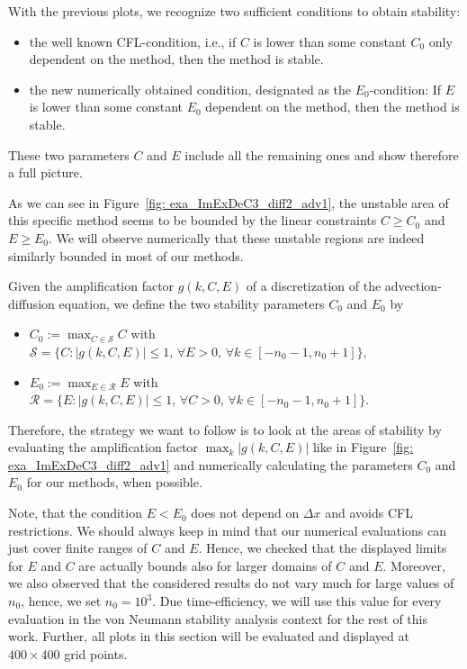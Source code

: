 \begin{remark}
	With the previous plots, we recognize two sufficient conditions to obtain stability:
	\begin{itemize}
		\item the well known CFL-condition, i.e., if $C$ is lower than some constant $C_0$ only dependent on the method, then the method is stable.
		\item the new numerically obtained condition, designated as the $E_0$-condition: If $E$ is lower than some constant $E_0$ dependent on the method, then the method is stable.
	\end{itemize}
	
	These two parameters $C$ and $E$ include all the remaining ones and show therefore a full picture.
\end{remark}

As we can see in Figure~\ref{fig: exa_ImExDeC3_diff2_adv1}, the unstable area of this specific method seems to be bounded by the linear constraints $C\geq C_0$ and $E\geq E_0$. We will observe numerically that these unstable regions are indeed similarly bounded in most of our methods.
\begin{definition}
	Given the amplification factor $g(k,C,E)$ of a discretization of the advection-diffusion equation, we define the two stability parameters $C_0$ and $E_0$ by
	\begin{itemize}
		\item $C_0:=\max_{C\in \mathcal{S}} C$ with $\mathcal{S}=\lbrace C: \lvert g(k,C,E)\rvert \leq 1, \, \forall E>0, \,\forall k \in [-n_0-1,n_0+1] \rbrace$,
		\item $E_0:=\max_{E\in \mathcal{R}}E$ with $\mathcal{R}= \lbrace E: \lvert g(k,C,E)\rvert \leq 1,\, \forall C>0,\,\forall k \in [-n_0-1,n_0+1]\rbrace .$
	\end{itemize}
\end{definition}
Therefore, the strategy we want to follow is to look at the areas of stability by evaluating the amplification factor $\max_k |g(k,C,E)|$ like in Figure~\ref{fig: exa_ImExDeC3_diff2_adv1} and numerically calculating the parameters $C_0$ and $E_0$ for our methods, when possible.

Note, that the condition $E<E_0$ does not depend on $\Delta x$ and avoids CFL restrictions. We should always keep in mind that our numerical evaluations can just cover finite ranges of $C$ and $E$. 
Hence, we checked that the displayed limits for $E$ and $C$ are actually bounds also for larger domains of $C$ and $E$.
Moreover, we also observed that the considered results do not vary much for large values of $n_0$, hence, we set $n_0=10^3$. Due time-efficiency, we will use this value for every evaluation in the von Neumann stability analysis context for the rest of this work. Further, all plots in this section will be evaluated and displayed at $400\times 400$ grid points.
